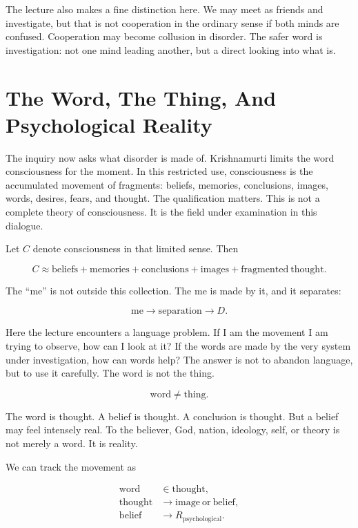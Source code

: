 The lecture also makes a fine distinction here. We may meet as friends and investigate, but that is not cooperation in the ordinary sense if both minds are confused. Cooperation may become collusion in disorder. The safer word is investigation: not one mind leading another, but a direct looking into what is.

\section{The Word, The Thing, And Psychological Reality}

The inquiry now asks what disorder is made of. Krishnamurti limits the word consciousness for the moment. In this restricted use, consciousness is the accumulated movement of fragments: beliefs, memories, conclusions, images, words, desires, fears, and thought. The qualification matters. This is not a complete theory of consciousness. It is the field under examination in this dialogue.

Let \(C\) denote consciousness in that limited sense. Then

\begin{equation}
C \approx
\mathrm{beliefs}
+\mathrm{memories}
+\mathrm{conclusions}
+\mathrm{images}
+\mathrm{fragmented\ thought}.
\end{equation}

The ``me'' is not outside this collection. The me is made by it, and it separates:

\begin{equation}
\mathrm{me}
\longrightarrow
\mathrm{separation}
\longrightarrow
D.
\end{equation}

Here the lecture encounters a language problem. If I am the movement I am trying to observe, how can I look at it? If the words are made by the very system under investigation, how can words help? The answer is not to abandon language, but to use it carefully. The word is not the thing.

\begin{equation}
\mathrm{word} \neq \mathrm{thing}.
\end{equation}

The word is thought. A belief is thought. A conclusion is thought. But a belief may feel intensely real. To the believer, God, nation, ideology, self, or theory is not merely a word. It is reality.

We can track the movement as

\begin{align}
\mathrm{word} &\in \mathrm{thought},\\
\mathrm{thought} &\longrightarrow \mathrm{image\ or\ belief},\\
\mathrm{belief} &\longrightarrow R_{\mathrm{psychological}}.
\end{align}

